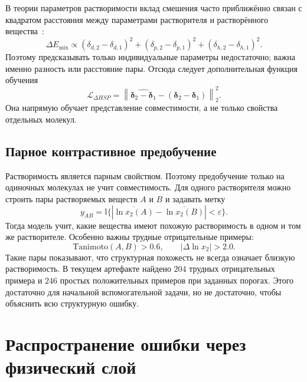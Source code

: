 \documentclass[11pt]{article}
\newcommand{\abs}[1]{\left\lvert #1 \right\rvert}
\theoremstyle{definition}
\begin{document}
В теории параметров растворимости вклад смешения часто приближённо связан с квадратом расстояния между параметрами растворителя и растворённого вещества~\cite{hansen2007}:
\begin{equation*}
    \Delta E_{\mathrm{mix}} \propto
    (\delta_{d,2}-\delta_{d,1})^2+
    (\delta_{p,2}-\delta_{p,1})^2+
    (\delta_{h,2}-\delta_{h,1})^2.
\end{equation*}
Поэтому предсказывать только индивидуальные параметры недостаточно; важна именно разность или расстояние пары. Отсюда следует дополнительная функция обучения
\begin{equation*}
    \mathcal L_{\Delta HSP}
    =\left\|\widehat{\boldsymbol\delta_2-\boldsymbol\delta_1}
    -(\boldsymbol\delta_2-\boldsymbol\delta_1)\right\|_2^2.
\end{equation*}
Она напрямую обучает представление совместимости, а не только свойства отдельных молекул.

\subsection{Парное контрастивное предобучение}

Растворимость является парным свойством. Поэтому предобучение только на одиночных молекулах не учит совместимость. Для одного растворителя можно строить пары растворяемых веществ $A$ и $B$ и задавать метку
\begin{equation*}
    y_{AB}=\mathbb I\{\abs{\overline{\ln x_2(A)}-\overline{\ln x_2(B)}}<\varepsilon\}.
\end{equation*}
Тогда модель учит, какие вещества имеют похожую растворимость в одном и том же растворителе. Особенно важны трудные отрицательные примеры:
\begin{equation*}
    \mathrm{Tanimoto}(A,B)>0.6,
    \qquad
    \abs{\Delta\ln x_2}>2.0.
\end{equation*}
Такие пары показывают, что структурная похожесть не всегда означает близкую растворимость. В текущем артефакте найдено $204$ трудных отрицательных примера и $246$ простых положительных примеров при заданных порогах. Этого достаточно для начальной вспомогательной задачи, но не достаточно, чтобы объяснить всю структурную ошибку.

\section{Распространение ошибки через физический слой}
\label{app:error-propagation}
\end{document}
